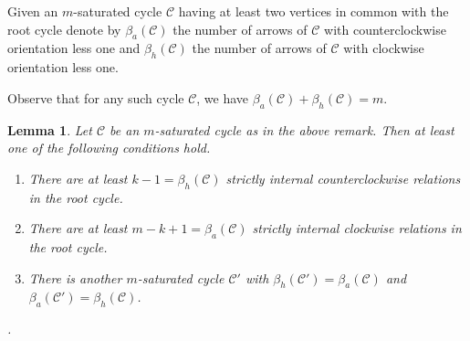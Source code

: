 \documentclass{amsart}
\theoremstyle{plain}
\newtheorem{lema}[teo]{Lemma}
\theoremstyle{definition}
\begin{document}
Given an  $m$-saturated cycle   $\mathcal{C}$ having at least two vertices in common with the root cycle  denote by $\beta_a(\mathcal{C})$ the number of arrows of $\mathcal{C}$ with counterclockwise orientation  less one and $\beta_h(\mathcal{C})$ the number of arrows of $\mathcal{C}$ with clockwise orientation  less one.

Observe that for any such   cycle $\mathcal{C}$, we have  $\beta_a(\mathcal{C})+\beta_h(\mathcal{C})=m$.\\

\begin{lema}\label{ciclo q comparte mas de una flecha entonces hay flechas - 1 relaciones en el sentido contrario}
Let  $\mathcal{C}$ be an   $m$-saturated cycle as in the above remark. Then at least one of the following conditions hold.

 \begin{enumerate}
   \item There are at least $k-1=\beta_h(\mathcal{C})$ strictly  internal counterclockwise relations in the root cycle.
   \item There are at least $m-k+1=\beta_a(\mathcal{C})$ strictly  internal clockwise relations in the root cycle.
   \item There is another  $m$-saturated cycle $\mathcal{C'}$  with $\beta_h(\mathcal{C}')=\beta_a(\mathcal{C})$ and $\beta_a(\mathcal{C}')=\beta_h(\mathcal{C})$.
 \end{enumerate}
        .
\end{lema}
\end{document}
